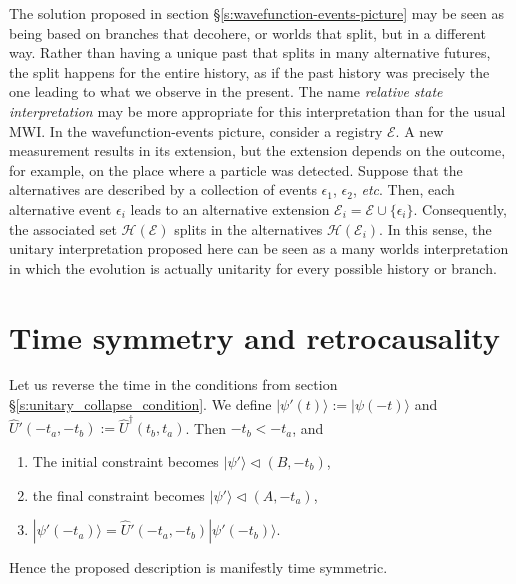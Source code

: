 \documentclass[11pt]{amsart}
\theoremstyle{definition}
\theoremstyle{plain}
\begin{document}
The solution proposed in section \S\ref{s:wavefunction-events-picture} may be seen as being based on branches that decohere, or worlds that split, but in a different way. Rather than having a unique past that splits in many alternative futures, the split happens for the entire history, as if the past history was precisely the one leading to what we observe in the present. The name \emph{relative state interpretation} may be more appropriate for this interpretation than for the usual MWI. In the wavefunction-events picture, consider a registry $\mathcal E$. A new measurement results in its extension, but the extension depends on the outcome, for example, on the place where a particle was detected. Suppose that the alternatives are described by a collection of events $\epsilon_1$, $\epsilon_2$, \textit{etc}. Then, each alternative event $\epsilon_i$ leads to an alternative extension $\mathcal E_i=\mathcal E\cup\{\epsilon_i\}$. Consequently, the associated set $\mathscr{H}(\mathcal E)$ splits in the alternatives $\mathscr{H}(\mathcal E_i)$. In this sense, the unitary interpretation proposed here can be seen as a many worlds interpretation in which the evolution is actually unitarity for every possible history or branch. 


\section{Time symmetry and retrocausality}
\label{s:time_symmetry}

Let us reverse the time in the conditions from section \S\ref{s:unitary_collapse_condition}. We define $|{\psi'(t)}\rangle:=|{\psi(-t)}\rangle$ and $\hat U'(-t_a,-t_b) := \hat U^\dagger(t_b,t_a)$. Then $-t_b < -t_a$, and

\begin{enumerate}
	\item 
The initial constraint becomes
$|{\psi'}\rangle\triangleleft(B,-t_b)$,
	\item 
the final constraint becomes
$|{\psi'}\rangle\triangleleft(A,-t_a)$,
	\item 
$|{\psi'(-t_a)}\rangle=\hat U'(-t_a,-t_b)|{\psi'(-t_b)}\rangle$.
\end{enumerate}

Hence the proposed description is manifestly time symmetric.
\end{document}
